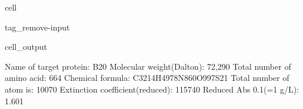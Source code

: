 \documentclass[letterpaper,10pt,english]{jupyterBook}
\begin{document}
\begin{sphinxuseclass}{cell}
\begin{sphinxuseclass}{tag_remove-input}\begin{sphinxVerbatimOutput}

\begin{sphinxuseclass}{cell_output}
\begin{sphinxVerbatim}[commandchars=\\\{\}]
\PYGZsh{} Name of target protein: \PYGZhy{}\PYGZhy{}\PYGZhy{}\PYGZhy{}\PYGZhy{}\PYGZhy{}\PYGZhy{}\PYGZhy{}\PYGZhy{}\PYGZhy{}\PYGZhy{}\PYGZhy{}\PYGZhy{}\PYGZhy{}\PYGZhy{}\PYGZhy{}\PYGZhy{}\PYGZhy{}\PYGZhy{}\PYGZhy{}\PYGZhy{}\PYGZhy{}\PYGZhy{}\PYGZhy{}\PYGZhy{}\PYGZhy{}\PYGZhy{}\PYGZhy{}\PYGZhy{}\PYGZhy{}\PYGZhy{}\PYGZhy{}\PYGZhy{}\PYGZhy{}\PYGZhy{}\PYGZhy{}\PYGZhy{}B20
\PYGZsh{} Molecular weight(Dalton): \PYGZhy{}\PYGZhy{}\PYGZhy{}\PYGZhy{}\PYGZhy{}\PYGZhy{}\PYGZhy{}\PYGZhy{}\PYGZhy{}\PYGZhy{}\PYGZhy{}\PYGZhy{}\PYGZhy{}\PYGZhy{}\PYGZhy{}\PYGZhy{}\PYGZhy{}\PYGZhy{}\PYGZhy{}\PYGZhy{}\PYGZhy{}\PYGZhy{}\PYGZhy{}\PYGZhy{}\PYGZhy{}\PYGZhy{}\PYGZhy{}\PYGZhy{}\PYGZhy{}\PYGZhy{}\PYGZhy{}\PYGZhy{}72,290
\PYGZsh{} Total number of amino acid: \PYGZhy{}\PYGZhy{}\PYGZhy{}\PYGZhy{}\PYGZhy{}\PYGZhy{}\PYGZhy{}\PYGZhy{}\PYGZhy{}\PYGZhy{}\PYGZhy{}\PYGZhy{}\PYGZhy{}\PYGZhy{}\PYGZhy{}\PYGZhy{}\PYGZhy{}\PYGZhy{}\PYGZhy{}\PYGZhy{}\PYGZhy{}\PYGZhy{}\PYGZhy{}\PYGZhy{}\PYGZhy{}\PYGZhy{}\PYGZhy{}\PYGZhy{}\PYGZhy{}\PYGZhy{}\PYGZhy{}\PYGZhy{}\PYGZhy{}664
\PYGZsh{} Chemical formula: \PYGZhy{}\PYGZhy{}\PYGZhy{}\PYGZhy{}\PYGZhy{}\PYGZhy{}\PYGZhy{}\PYGZhy{}\PYGZhy{}\PYGZhy{}\PYGZhy{}\PYGZhy{}\PYGZhy{}\PYGZhy{}\PYGZhy{}\PYGZhy{}\PYGZhy{}\PYGZhy{}\PYGZhy{}\PYGZhy{}\PYGZhy{}\PYGZhy{}\PYGZhy{}\PYGZhy{}\PYGZhy{}C3214H4978N860O997S21
\PYGZsh{} Total number of atom is: \PYGZhy{}\PYGZhy{}\PYGZhy{}\PYGZhy{}\PYGZhy{}\PYGZhy{}\PYGZhy{}\PYGZhy{}\PYGZhy{}\PYGZhy{}\PYGZhy{}\PYGZhy{}\PYGZhy{}\PYGZhy{}\PYGZhy{}\PYGZhy{}\PYGZhy{}\PYGZhy{}\PYGZhy{}\PYGZhy{}\PYGZhy{}\PYGZhy{}\PYGZhy{}\PYGZhy{}\PYGZhy{}\PYGZhy{}\PYGZhy{}\PYGZhy{}\PYGZhy{}\PYGZhy{}\PYGZhy{}\PYGZhy{}\PYGZhy{}\PYGZhy{}10070
\PYGZsh{} Extinction coefficient(reduced): \PYGZhy{}\PYGZhy{}\PYGZhy{}\PYGZhy{}\PYGZhy{}\PYGZhy{}\PYGZhy{}\PYGZhy{}\PYGZhy{}\PYGZhy{}\PYGZhy{}\PYGZhy{}\PYGZhy{}\PYGZhy{}\PYGZhy{}\PYGZhy{}\PYGZhy{}\PYGZhy{}\PYGZhy{}\PYGZhy{}\PYGZhy{}\PYGZhy{}\PYGZhy{}\PYGZhy{}\PYGZhy{}115740
\PYGZsh{} Reduced Abs 0.1\PYGZpc{}(=1 g/L): \PYGZhy{}\PYGZhy{}\PYGZhy{}\PYGZhy{}\PYGZhy{}\PYGZhy{}\PYGZhy{}\PYGZhy{}\PYGZhy{}\PYGZhy{}\PYGZhy{}\PYGZhy{}\PYGZhy{}\PYGZhy{}\PYGZhy{}\PYGZhy{}\PYGZhy{}\PYGZhy{}\PYGZhy{}\PYGZhy{}\PYGZhy{}\PYGZhy{}\PYGZhy{}\PYGZhy{}\PYGZhy{}\PYGZhy{}\PYGZhy{}\PYGZhy{}\PYGZhy{}\PYGZhy{}\PYGZhy{}\PYGZhy{}\PYGZhy{}1.601

\end{sphinxVerbatim}
\end{sphinxuseclass}
\end{sphinxVerbatimOutput}
\end{sphinxuseclass}
\end{sphinxuseclass}
\end{document}
